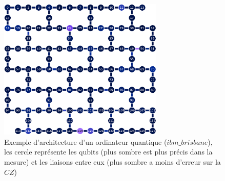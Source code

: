 \begin{figure}[H]
\centering
\includegraphics[width=0.7\textwidth]{images/futur/limitation/ibm_brisbane_example.eps}
\caption{Exemple d'architecture d'un ordinateur quantique ($ibm\_brisbane$), les cercle représente les qubits (plus sombre est plus précis dans la mesure) et les liaisons entre eux (plus sombre a moins d'erreur sur la $CZ$)}
\label{fig:arch-qc}
\end{figure}

